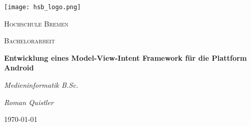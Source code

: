 \begin{titlepage}
	\centering
	\texttt{[image: hsb\_logo.png]}
	\par\vspace{1cm}
	{\scshape\LARGE Hochschule Bremen \par}
	\vspace{1cm}
	{\scshape\Large Bachelorarbeit  \par}
	\vspace{1.5cm}
	{\LARGE\bfseries Entwicklung eines Model-View-Intent Framework für die Plattform Android\par}
	\vspace{0.5cm}
	{\normalsize\itshape Medieninformatik B.Sc. \par}
	\vspace{2cm}
	{\Large\itshape Roman Quistler \par}
	\vfill
	\vfill
	{\large\today\par}
\end{titlepage}